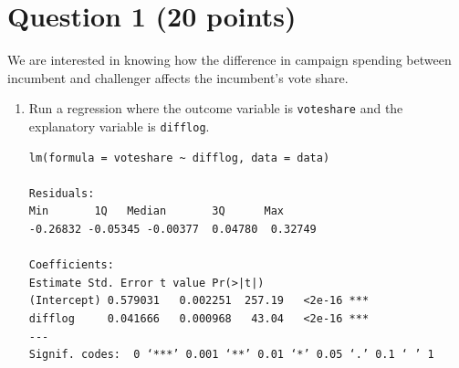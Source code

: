 \documentclass[12pt,letterpaper]{article}
\begin{document}
\section*{Question 1 (20 points)}
\vspace{.25cm}
\noindent We are interested in knowing how the difference in campaign spending between incumbent and challenger affects the incumbent's vote share. 
	\begin{enumerate}
		\item Run a regression where the outcome variable is \texttt{voteshare} and the explanatory variable is \texttt{difflog}.
		
		
		\begin{Verbatim}
lm(formula = voteshare ~ difflog, data = data)
		
Residuals:
Min       1Q   Median       3Q      Max 
-0.26832 -0.05345 -0.00377  0.04780  0.32749 
		
Coefficients:
Estimate Std. Error t value Pr(>|t|)    
(Intercept) 0.579031   0.002251  257.19   <2e-16 ***
difflog     0.041666   0.000968   43.04   <2e-16 ***
---
Signif. codes:  0 ‘***’ 0.001 ‘**’ 0.01 ‘*’ 0.05 ‘.’ 0.1 ‘ ’ 1


\end{Verbatim}
\end{enumerate}
\end{document}
